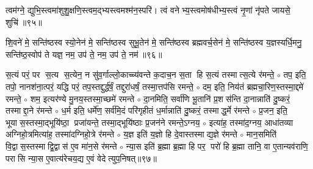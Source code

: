 त्वम॑ग्ने॒ द्युभि॒स्त्वमा॑शुशु॒क्षणि॒स्त्वम॒द्भ्यस्त्वमश्म॑न॒स्परि॑। त्वं वनेभ्य॒स्त्वमोष॑धीभ्य॒स्त्वं नृ॒णां नृ॑पते जायसे॒ शुचि॑॥९५॥
\anuvakamend

शि॒वने॑ मे॒ सन्ति॑ष्ठस्व स्यो॒नेन॑  मे॒ सन्ति॑ष्ठस्व सुभू॒तेन॑  मे॒ सन्ति॑ष्ठस्व ब्रह्मवर्च॒सेन॑  मे॒ सन्ति॑ष्ठस्व य॒ज्ञस्यर्धि॒मनु॒ सन्ति॑ष्ठ॒स्वोप॑ ते यज्ञ॒ नम॒ उप॑ ते॒ नम॒ उप॑ ते॒ नम॑॥९६॥ 
\anuvakamend

\newcommand{\sep}{{\small$\circ$} }
स॒त्यं परं॒ पर स॒त्य स॒त्येन॒ न सु॑व॒र्गाल्लो॒काच्च्य॑वन्ते क॒दाच॒न स॒ता हि स॒त्यं तस्मात्स॒त्ये र॑मन्ते॒ \sep
तप॒ इति॒ तपो॒ नानश॑ना॒त्परं॒ यद्धि परं॒ तप॒स्तद्दुर्द्ध॑र्\mbox{}षं॒ तद्दुरा॑धर्\mbox{}षं॒ तस्मा॒त्तप॑सि रमन्ते॒ \sep
दम॒ इति॒ निय॑तं ब्रह्मचा॒रिण॒स्तस्मा॒द्दमे॑ रमन्ते॒ \sep
शम॒ इत्यर॑ण्ये मु॒नय॒स्तस्मा॒च्छमे॑ रमन्ते \sep
दा॒नमिति॒ सर्वा॑णि भू॒तानि॑ प्र॒शस॑न्ति दा॒नान्नाति॑ दु॒ष्करं॒ तस्माद्दा॒ने र॑मन्ते \sep
ध॒र्म इति॒ धर्मे॑ण॒ सर्व॑मि॒दं परि॑गृहीतं ध॒र्मान्नाति॑ दु॒ष्करं॒ तस्माद्ध॒र्मे र॑मन्ते \sep
प्र॒जन॒ इति॒ भूयास॒स्तस्मा॒द्भूयि॑ष्ठा॒ प्रजा॑यन्ते॒ तस्मा॒द्भूयि॑ष्ठाः प्र॒जन॑ने रमन्ते॒ऽग्नय॒ \sep
इत्या॑ह॒ तस्मा॑द॒ग्नय॒ आधा॑तव्या अग्निहो॒त्रमित्या॑ह॒ तस्मा॑दग्निहो॒त्रे र॑मन्ते \sep
य॒ज्ञ इति॑ य॒ज्ञो हि दे॒वास्तस्माद्य॒ज्ञे र॑मन्ते \sep
मान॒समिति॑ वि॒द्वास॒स्तस्माद्वि॒द्वास॑ ए॒व मा॑न॒से र॑मन्ते \sep
न्या॒स इति॑ ब्र॒ह्मा ब्र॒ह्मा हि पर॒ परो॑ हि ब्र॒ह्मा तानि॒ वा ए॒तान्यव॑राणि॒ परासि न्या॒स ए॒वात्य॑रेचय॒द्य ए॒वं वेदेत्युप॒निषत्॥९७॥
\anuvakamend


